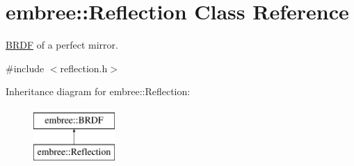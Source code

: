 \hypertarget{classembree_1_1_reflection}{
\section{embree::Reflection Class Reference}
\label{classembree_1_1_reflection}
}


\hyperlink{classembree_1_1_b_r_d_f}{BRDF} of a perfect mirror.  




{\ttfamily \#include $<$reflection.h$>$}

Inheritance diagram for embree::Reflection:\begin{figure}[H]
\begin{center}
\leavevmode
\includegraphics[height=2.000000cm]{classembree_1_1_reflection}
\end{center}
\end{figure}
